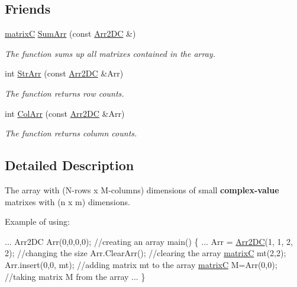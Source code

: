 \subsection*{Friends}
\begin{DoxyCompactItemize}
\item 
\mbox{\hyperlink{classmatrix_c}{matrixC}} \mbox{\hyperlink{class_arr2_d_c_a53869598c61113fadda2f980309c2447}{Sum\+Arr}} (const \mbox{\hyperlink{class_arr2_d_c}{Arr2\+DC}} \&)
\begin{DoxyCompactList}\small\item\em The function sums up all matrixes contained in the array. \end{DoxyCompactList}\item 
int \mbox{\hyperlink{class_arr2_d_c_ac686d532a33928dd85ffeaa6000cd23c}{Str\+Arr}} (const \mbox{\hyperlink{class_arr2_d_c}{Arr2\+DC}} \&Arr)
\begin{DoxyCompactList}\small\item\em The function returns row counts. \end{DoxyCompactList}\item 
int \mbox{\hyperlink{class_arr2_d_c_a5e4430d3d9e09293206b128454ff38d4}{Col\+Arr}} (const \mbox{\hyperlink{class_arr2_d_c}{Arr2\+DC}} \&Arr)
\begin{DoxyCompactList}\small\item\em The function returns column counts. \end{DoxyCompactList}\end{DoxyCompactItemize}


\subsection{Detailed Description}
The array with (N-\/rows x M-\/columns) dimensions of small {\bfseries complex-\/value} matrixes with (n x m) dimensions. 

Example of using\+: 
\begin{DoxyCode}
...
Arr2DC Arr(0,0,0,0); \textcolor{comment}{//creating an array}
main() 
\{
  ...
  Arr = \mbox{\hyperlink{class_arr2_d_c}{Arr2DC}}(1, 1, 2, 2); \textcolor{comment}{//changing the size}
  Arr.ClearArr();   \textcolor{comment}{//clearing the array}
  \mbox{\hyperlink{classmatrix_c}{matrixC}} mt(2,2);  
  Arr.insert(0,0, mt); \textcolor{comment}{//adding matrix mt to the array}
  \mbox{\hyperlink{classmatrix_c}{matrixC}} M=Arr(0,0); \textcolor{comment}{//taking matrix M from the array}
  ... 
\}
\end{DoxyCode}
 

